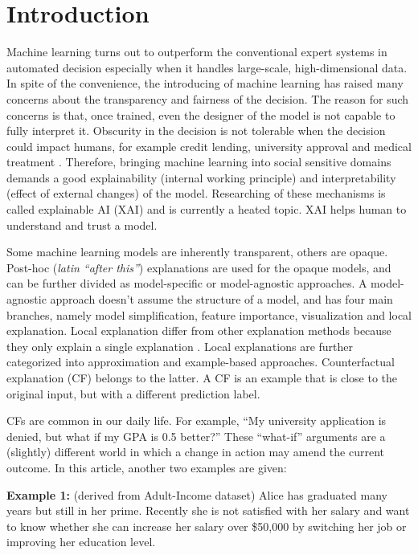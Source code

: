 \section{Introduction}
Machine learning turns out to outperform the conventional expert systems in automated decision especially when it handles large-scale, high-dimensional data. In spite of the convenience, the introducing of machine learning has raised many concerns about the transparency and fairness of the decision. The reason for such concerns is that, once trained, even the designer of the model is not capable to fully interpret it. Obscurity in the decision is not tolerable when the decision could impact humans, for example credit lending, university approval and medical treatment \cite{CFReview}. Therefore, bringing machine learning into social sensitive domains demands a good explainability (internal working principle) and interpretability (effect of external changes) of the model. %
Researching of these mechanisms is called explainable AI (XAI) and is currently a heated topic. XAI helps human to understand and trust a model.

Some machine learning models are inherently transparent, others are opaque. Post-hoc (\emph{latin ``after this''}) explanations are used for the opaque models, and can be further divided as model-specific or model-agnostic approaches. A model-agnostic approach doesn't assume the structure of a model, and has four main branches, namely model simplification, feature importance, visualization and local explanation. Local explanation differ from other explanation methods because they only explain a single explanation \cite{CFReview}. Local explanations are further categorized into approximation and example-based approaches. Counterfactual explanation (CF) belongs to the latter. A CF is an example that is close to the original input, but with a different prediction label.

CFs are common in our daily life. For example, ``My university application is denied, but what if my GPA is 0.5 better?'' These ``what-if'' arguments are a (slightly) different world in which a change in action may amend the current outcome. In this article, another two examples are given:

\noindent \textbf{Example 1:} \label{a}(derived from Adult-Income dataset) Alice has graduated many years but still in her prime. Recently she is not satisfied with her salary and want to know whether she can increase her salary over \$50,000 by switching her job or improving her education level.

